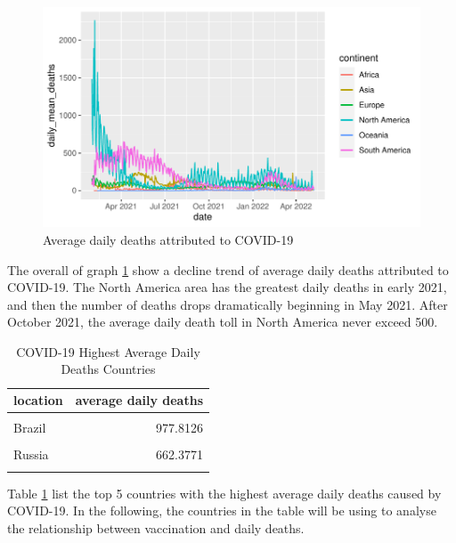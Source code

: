 \documentclass[11pt,a4paper,]{article}
\begin{document}
\begin{figure}

{\centering \includegraphics{report_files/figure-latex/Figure2-1} 

}

\caption{Average daily deaths attributed to COVID-19}\label{fig:Figure2}
\end{figure}

The overall of graph \ref{fig:Figure2} show a decline trend of average daily deaths attributed to COVID-19. The North America area has the greatest daily deaths in early 2021, and then the number of deaths drops dramatically beginning in May 2021. After October 2021, the average daily death toll in North America never exceed 500.

\begin{table}[!h]

\caption{\label{tab:Table2}COVID-19 Highest Average Daily Deaths Countries}
\centering
\begin{tabular}[t]{l|r}
\hline
location & average daily deaths\\
\hline
\cellcolor{gray!6}{United States} & \cellcolor{gray!6}{1200.9892}\\
\hline
Brazil & 977.8126\\
\hline
\cellcolor{gray!6}{India} & \cellcolor{gray!6}{797.7945}\\
\hline
Russia & 662.3771\\
\hline
\cellcolor{gray!6}{Mexico} & \cellcolor{gray!6}{396.0946}\\
\hline
\end{tabular}
\end{table}

Table \ref{tab:Table2} list the top 5 countries with the highest average daily deaths caused by COVID-19.
In the following, the countries in the table will be using to analyse the relationship between vaccination and daily deaths.
\end{document}
